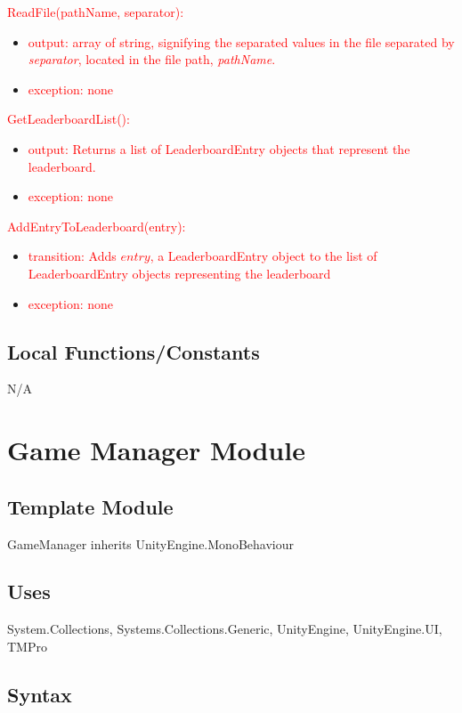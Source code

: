 \documentclass[12pt]{article}
\begin{document}
\noindent \textcolor{red}{ReadFile(pathName, separator):}
\begin{itemize}
    \item \textcolor{red}{output: array of string, signifying the separated values in the file separated by \textit{separator}, located in the file path, \textit{pathName}.}
    \item \textcolor{red}{exception: none}
\end{itemize}

\noindent \textcolor{red}{GetLeaderboardList():}
\begin{itemize}
    \item \textcolor{red}{output: Returns a list of LeaderboardEntry objects that represent the leaderboard.}
    \item \textcolor{red}{exception: none}
\end{itemize}

\noindent \textcolor{red}{AddEntryToLeaderboard(entry):}
\begin{itemize}
    \item \textcolor{red}{transition: Adds $entry$, a LeaderboardEntry object to the list of LeaderboardEntry objects representing the leaderboard}
    \item \textcolor{red}{exception: none}
\end{itemize}

\subsection{Local Functions/Constants}
N/A

\newpage
\section{Game Manager Module}

\subsection{Template Module}
GameManager inherits UnityEngine.MonoBehaviour

\subsection{Uses}
System.Collections, Systems.Collections.Generic, UnityEngine, UnityEngine.UI, TMPro

\subsection{Syntax}
\end{document}
